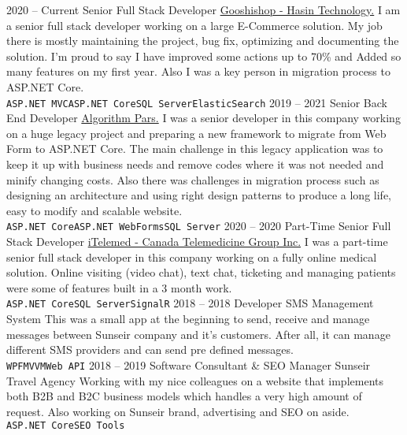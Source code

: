 \documentclass[a4paper]{developercv} %
\begin{document}

\begin{entrylist}
	\entry
	{2020 -- Current}
	{Senior Full Stack Developer}
	{\href{https://gooshishop.com}{Gooshishop - Hasin Technology.}}
	{I am a senior full stack developer working on a large E-Commerce solution. My job there is mostly maintaining the project, bug fix, optimizing and documenting the solution. I'm proud to say I have improved some actions up to 70\% and Added so many features on my first year. Also I was a key person in migration process to ASP.NET Core.
		\\\texttt{ASP.NET MVC}\slashsep\texttt{ASP.NET Core}\slashsep\texttt{SQL Server}\slashsep\texttt{ElasticSearch}}
	\entry
	{2019 -- 2021}
	{Senior Back End Developer}
	{\href{https://apdp.ir}{Algorithm Pars.}}
	{I was a senior developer in this company working on a huge legacy project and preparing a new framework to migrate from Web Form to ASP.NET Core. The main challenge in this legacy application was to keep it up with business needs and remove codes where it was not needed and minify changing costs. Also there was challenges in migration process such as designing an architecture and using right design patterns to produce a long life, easy to modify and scalable website.
		\\\texttt{ASP.NET Core}\slashsep\texttt{ASP.NET WebForms}\slashsep\texttt{SQL Server}}
	\entry
	{2020 -- 2020}
	{Part-Time Senior Full Stack Developer}
	{\href{https://itelemed.ca}{iTelemed - Canada Telemedicine Group Inc.}}
	{I was a part-time senior full stack developer in this company working on a fully online medical solution. Online visiting (video chat), text chat, ticketing and managing patients were some of features built in a 3 month work.
		\\\texttt{ASP.NET Core}\slashsep\texttt{SQL Server}\slashsep\texttt{SignalR}}
	\entry
	{2018 -- 2018}
	{Developer}
	{SMS Management System}
	{This was a small app at the beginning to send, receive and manage messages between Sunseir company and it's customers. After all, it can manage different SMS providers and can send pre defined messages.
		\\\texttt{WPF}\slashsep\texttt{MVVM}\slashsep\texttt{Web API}}
	\entry
	{2018 -- 2019}
	{Software Consultant \& SEO Manager}
	{Sunseir Travel Agency}
	{Working with my nice colleagues on a website that implements both B2B and B2C business models which handles a very high amount of request. Also working on Sunseir brand, advertising and SEO on aside.
		\\\texttt{ASP.NET Core}\slashsep\texttt{SEO Tools}}

\end{entrylist}
\end{document}
